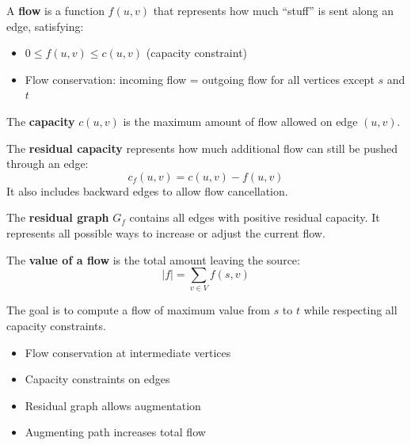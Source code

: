 \documentclass[11pt,a4paper,openany]{book}
\begin{document}
\begin{defnbox}[title=Flow]
A \textbf{flow} is a function $f(u,v)$ that represents how much “stuff” is sent along an edge, satisfying:
\begin{itemize}
    \item $0 \le f(u,v) \le c(u,v)$ (capacity constraint)
    \item Flow conservation: incoming flow = outgoing flow for all vertices except $s$ and $t$
\end{itemize}
\end{defnbox}

\begin{defnbox}[title=Capacity]
The \textbf{capacity} $c(u,v)$ is the maximum amount of flow allowed on edge $(u,v)$.
\end{defnbox}

\begin{defnbox}[title=Residual Capacity]
The \textbf{residual capacity} represents how much additional flow can still be pushed through an edge:
\[
c_f(u,v) = c(u,v) - f(u,v)
\]
It also includes backward edges to allow flow cancellation.
\end{defnbox}

\begin{defnbox}[title=Residual Graph]
The \textbf{residual graph} $G_f$ contains all edges with positive residual capacity.  
It represents all possible ways to increase or adjust the current flow.
\end{defnbox}

\begin{defnbox}[title=Flow Value]
The \textbf{value of a flow} is the total amount leaving the source:
\[
|f| = \sum_{v \in V} f(s,v)
\]
\end{defnbox}

\begin{defnbox}[title=Max Flow Problem]
The goal is to compute a flow of maximum value from $s$ to $t$ while respecting all capacity constraints.
\end{defnbox}

\begin{defnbox}[title=Key Ideas to Know]
\begin{itemize}
    \item Flow conservation at intermediate vertices
    \item Capacity constraints on edges
    \item Residual graph allows augmentation
    \item Augmenting path increases total flow
\end{itemize}
\end{defnbox}
\end{document}
